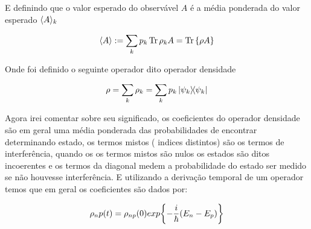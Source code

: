 \documentclass{article}
\begin{document}
	E definindo que o valor esperado do observável $A$ é a média ponderada do valor esperado $\langle A \rangle_k$
	
	$$\langle A \rangle:=\sum_k p_k \Tr \rho_kA= \Tr \qty{\rho A}$$
	
	Onde foi definido o seguinte operador dito operador densidade
	
	$$\rho=\sum_k \rho_k= \sum_k p_k\dyad{\psi_k}$$
	
	Agora irei comentar sobre seu significado, os coeficientes do operador densidade são em geral uma média ponderada das probabilidades de encontrar determinando estado, os termos mistos ( indices distintos) são os termos de interferência, quando os os termos mistos são nulos os estados são ditos incoerentes e os termos da diagonal medem a probabilidade do estado ser medido se não houvesse interferência. E utilizando a derivação temporal de um operador temos que em geral os coeficientes são dados por:
	
	$$\rho_np(t)=\rho_{np}(0)exp \qty{- \frac{i}{\hbar}(E_n-E_p)}$$
	
\end{document}
